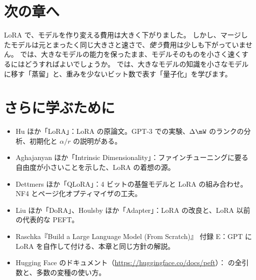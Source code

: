 \section*{次の章へ}
LoRA で、モデルを作り変える費用は大きく下がりました。
しかし、マージしたモデルは元とまったく同じ大きさと速さで、\emph{使う}費用は少しも下がっていません。
では、大きなモデルの能力を保ったまま、モデルそのものを小さく速くするにはどうすればよいでしょうか。
では、大きなモデルの知識を小さなモデルに移す「蒸留」と、重みを少ないビット数で表す「量子化」を学びます。

\section*{さらに学ぶために}
\begin{itemize}
\item Hu ほか「LoRA」\cite{hu2022lora}：LoRA の原論文。GPT-3 での実験、$\Delta\mW$ のランクの分析、初期化と $\alpha/r$ の説明がある。
\item Aghajanyan ほか「Intrinsic Dimensionality」\cite{aghajanyan2021intrinsic}：ファインチューニングに要る自由度が小さいことを示した、LoRA の着想の源。
\item Dettmers ほか「QLoRA」\cite{dettmers2023qlora}：4 ビットの基盤モデルと LoRA の組み合わせ。NF4 とページ化オプティマイザの工夫。
\item Liu ほか「DoRA」\cite{liu2024dora}、Houlsby ほか「Adapter」\cite{houlsby2019parameter}：LoRA の改良と、LoRA 以前の代表的な PEFT。
\item Raschka『Build a Large Language Model (From Scratch)』\cite{raschka2024build} 付録 E：GPT に LoRA を自作して付ける、本章と同じ方針の解説。
\item Hugging Face  のドキュメント（\url{https://huggingface.co/docs/peft}）： の全引数と、多数の変種の使い方。
\end{itemize}

